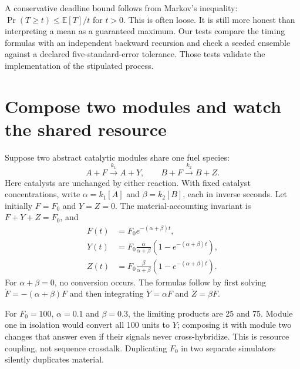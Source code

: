 A conservative deadline bound follows from Markov's inequality:
$\Pr(T\geq t)\leq\mathbb E[T]/t$ for $t>0$. This is often loose. It is still
more honest than interpreting a mean as a guaranteed maximum. Our tests
compare the timing formulas with an independent backward recursion and
check a seeded ensemble against a declared five-standard-error tolerance.
Those tests validate the implementation of the stipulated process.

\section{Compose two modules and watch the shared resource}

Suppose two abstract catalytic modules share one fuel species:
\begin{equation}
 A+F\xrightarrow{k_1}A+Y,\qquad
 B+F\xrightarrow{k_2}B+Z.
 \label{eq:fuel}
\end{equation}
Here catalysts are unchanged by either reaction. With fixed catalyst
concentrations, write $\alpha=k_1[A]$ and $\beta=k_2[B]$, each in inverse
seconds. Let initially $F=F_0$ and $Y=Z=0$. The material-accounting invariant
is $F+Y+Z=F_0$, and
\begin{align}
 F(t)&=F_0e^{-(\alpha+\beta)t},\\
 Y(t)&=F_0\frac{\alpha}{\alpha+\beta}
             (1-e^{-(\alpha+\beta)t}),\\
 Z(t)&=F_0\frac{\beta}{\alpha+\beta}
             (1-e^{-(\alpha+\beta)t}).
 \label{eq:fuel-sol}
\end{align}
For $\alpha+\beta=0$, no conversion occurs. The formulas follow by first
solving $\dot F=-(\alpha+\beta)F$ and then integrating $\dot Y=\alpha F$
and $\dot Z=\beta F$.


\begin{center}\end{center}
For $F_0=100$, $\alpha=0.1$ and $\beta=0.3$, the limiting products are
25 and 75. Module one in isolation would convert all 100 units to $Y$;
composing it with module two changes that answer even if their signals
never cross-hybridize. This is resource coupling, not sequence crosstalk.
Duplicating $F_0$ in two separate simulators silently duplicates material.

